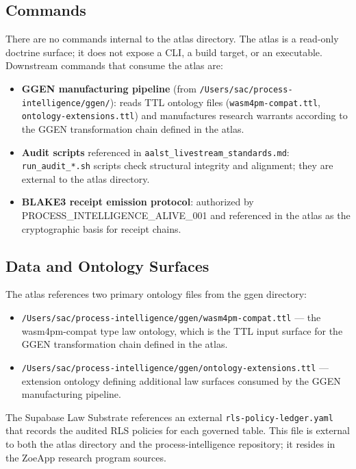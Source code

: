 \subsection{Commands}
\label{sec:atlas-impl-commands}

There are no commands internal to the atlas directory. The atlas is a
read-only doctrine surface; it does not expose a CLI, a build target, or an
executable. Downstream commands that consume the atlas are:

\begin{itemize}
  \item \textbf{GGEN manufacturing pipeline} (from \texttt{/Users/sac/process-intelligence/ggen/}):
        reads TTL ontology files (\texttt{wasm4pm-compat.ttl},
        \texttt{ontology-extensions.ttl}) and manufactures research warrants
        according to the GGEN transformation chain defined in the atlas.
  \item \textbf{Audit scripts} referenced in \texttt{aalst\_livestream\_standards.md}:
        \texttt{run\_audit\_*.sh} scripts check structural integrity and
        alignment; they are external to the atlas directory.
  \item \textbf{BLAKE3 receipt emission protocol}: authorized by
        PROCESS\_INTELLIGENCE\_ALIVE\_001 and referenced in the atlas as the
        cryptographic basis for receipt chains.
\end{itemize}

\subsection{Data and Ontology Surfaces}
\label{sec:atlas-impl-ontology}

The atlas references two primary ontology files from the ggen directory:

\begin{itemize}
  \item \texttt{/Users/sac/process-intelligence/ggen/wasm4pm-compat.ttl} ---
        the wasm4pm-compat type law ontology, which is the TTL input surface for
        the GGEN transformation chain defined in the atlas.
  \item \texttt{/Users/sac/process-intelligence/ggen/ontology-extensions.ttl}
        --- extension ontology defining additional law surfaces consumed by the
        GGEN manufacturing pipeline.
\end{itemize}

The Supabase Law Substrate references an external \texttt{rls-policy-ledger.yaml}
that records the audited RLS policies for each governed table. This file is
external to both the atlas directory and the process-intelligence repository; it
resides in the ZoeApp research program sources.


